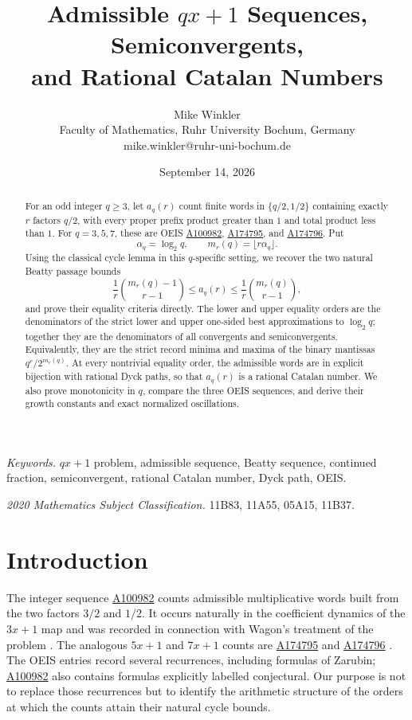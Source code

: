 \documentclass[11pt]{article}
\title{Admissible \(qx+1\) Sequences, Semiconvergents,\\
and Rational Catalan Numbers\\[5mm]}
\author{Mike Winkler\\[5mm]
Faculty of Mathematics, Ruhr University Bochum, Germany
\\mike.winkler@ruhr-uni-bochum.de}
\date{September 14, 2026\\[5mm]}
\newcommand{\OEIS}[1]{\href{https://oeis.org/#1}{#1}}
\begin{document}
\maketitle

\begin{abstract}
For an odd integer \(q\geq3\), let \(a_q(r)\) count finite words in
\(\{q/2,1/2\}\) containing exactly \(r\) factors \(q/2\), with every
proper prefix product greater than \(1\) and total product less than \(1\).
For \(q=3,5,7\), these are OEIS \OEIS{A100982}, \OEIS{A174795}, and
\OEIS{A174796}. Put
\[
 \alpha_q=\log_2q,\qquad m_r(q)=\lfloor r\alpha_q\rfloor.
\]
Using the classical cycle lemma in this \(q\)-specific setting, we recover
the two natural Beatty passage bounds
\[
 \frac1r\binom{m_r(q)-1}{r-1}
 \leq a_q(r)\leq
 \frac1r\binom{m_r(q)}{r-1},
\]
and prove their equality criteria directly. The lower and upper equality
orders are the denominators of the strict lower and upper one-sided best
approximations to \(\log_2q\); together they are the denominators of all
convergents and semiconvergents. Equivalently, they are the strict record
minima and maxima of the binary mantissas \(q^r/2^{m_r(q)}\). At every
nontrivial equality order, the admissible words are in explicit bijection
with rational Dyck paths, so that \(a_q(r)\) is a rational Catalan number.
We also prove monotonicity in \(q\), compare the three OEIS sequences, and
derive their growth constants and exact normalized oscillations.
\end{abstract}

\medskip
\noindent\textit{Keywords.}
\(qx+1\) problem, admissible sequence, Beatty sequence, continued fraction,
semiconvergent, rational Catalan number, Dyck path, OEIS.

\smallskip
\noindent\textit{2020 Mathematics Subject Classification.}
11B83, 11A55, 05A15, 11B37.

\section{Introduction}
\label{sec:introduction}

The integer sequence \OEIS{A100982} counts admissible multiplicative words
built from the two factors \(3/2\) and \(1/2\). It occurs naturally in the
coefficient dynamics of the \(3x+1\) map and was recorded in connection
with Wagon's treatment of the problem \cite{Wagon85,OEIS100982}. The
analogous \(5x+1\) and \(7x+1\) counts are \OEIS{A174795} and
\OEIS{A174796} \cite{OEIS174795,OEIS174796}. The OEIS entries record several recurrences, including formulas of
Zarubin; \OEIS{A100982} also contains formulas explicitly labelled
conjectural. Our purpose is not to replace those recurrences but to identify
the arithmetic structure of the orders at which the counts attain their
natural cycle bounds.
\end{document}
